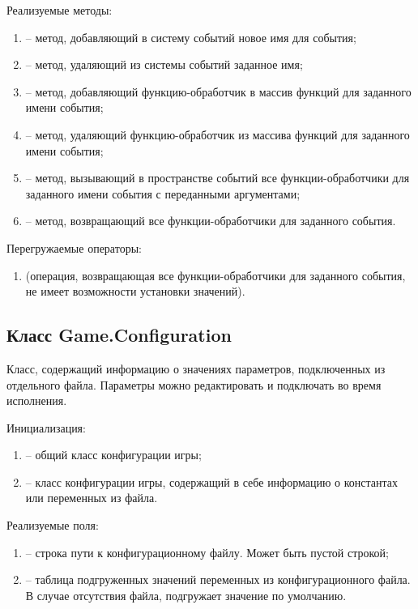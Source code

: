 	\noindent Реализуемые методы:
	\begin{enumerate}
		\item {} -- метод, добавляющий в систему событий новое имя для события;
		\item {} -- метод, удаляющий из системы событий заданное имя;
		\item {} -- метод, добавляющий функцию-обработчик в массив функций для заданного имени события;
		\item {} -- метод, удаляющий функцию-обработчик из массива функций для заданного имени события;
		\item {} -- метод, вызывающий в пространстве событий все функции-обработчики для заданного имени события с переданными аргументами;
		\item {} -- метод, возвращающий все функции-обработчики для заданного события.
	\end{enumerate}

	\noindent Перегружаемые операторы:
	\begin{enumerate}
		\item {} (операция, возвращающая все функции-обработчики для заданного события, не имеет возможности установки значений).
	\end{enumerate}


\subsection{Класс Game.Configuration}

	Класс, содержащий информацию о значениях параметров, подключенных из отдельного файла. Параметры можно редактировать и подключать во время исполнения.

	\noindent Инициализация:
	\begin{enumerate}
		\item {} -- общий класс конфигурации игры;
		\item {} -- класс конфигурации игры, содержащий в себе информацию о константах или переменных из файла.
	\end{enumerate}

	\noindent Реализуемые поля:
	\begin{enumerate}
		\item {} -- строка пути к конфигурационному файлу. Может быть пустой строкой;
		\item {} -- таблица подгруженных значений переменных из конфигурационного файла. В случае отсутствия файла, подгружает значение по умолчанию.
	\end{enumerate}

